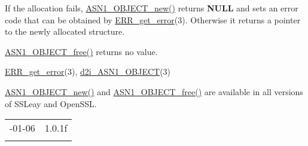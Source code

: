 \documentclass[]{article}
\let\realtextbf=\textbf
\renewcommand{\textbf}[1]{\textcolor{boldcolor}{\realtextbf{#1}}}
\renewcommand{\emph}[1]{\underline{#1}}
\begin{document}

If the allocation fails, \emph{ASN1\_OBJECT\_new()} returns
\textbf{NULL} and sets an error code that can be obtained by
\emph{ERR\_get\_error}(3). Otherwise it returns a pointer to the newly
allocated structure.

\emph{ASN1\_OBJECT\_free()} returns no value.


\emph{ERR\_get\_error}(3), \emph{d2i\_ASN1\_OBJECT}(3)


\emph{ASN1\_OBJECT\_new()} and \emph{ASN1\_OBJECT\_free()} are available
in all versions of SSLeay and OpenSSL.

\begin{longtable}[c]{@{}ll@{}}
\toprule\addlinespace
2014-01-06 & 1.0.1f
\\\addlinespace
\bottomrule
\end{longtable}
\end{document}
